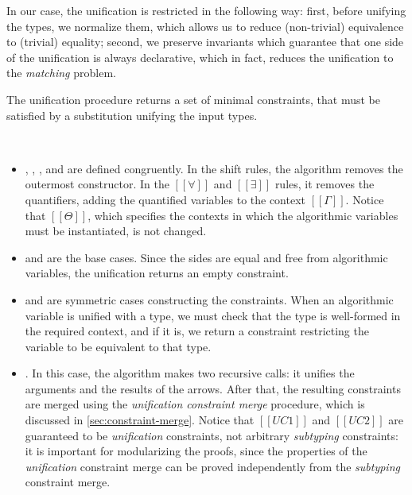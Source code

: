 \documentclass[acmsmall,natbib=false,review,anonymous]{acmart}
\begin{document}
In our case, the unification is restricted in the following way:
first, before unifying the types, we normalize them, which 
allows us to reduce (non-trivial) equivalence to (trivial) equality;
second, we preserve invariants which guarantee that
one side of the unification is always declarative, which in fact, 
reduces the unification to the \emph{matching} problem.

The unification procedure
returns a set of minimal constraints,
that must be satisfied by a substitution
unifying the input types.

\begin{algorithm}[Unification]
  \hfill
  \begin{multicols}{2}
  \ottdefnUNUnif{}
  \columnbreak\\
  \ottdefnUPUnif{}
  \end{multicols}
\end{algorithm}


\begin{itemize}
  \item {}, , 
    , and 
    are defined congruently. In the shift rules, the algorithm
    removes the outermost constructor. In the
    $[[∀]]$ and $[[∃]]$ rules, it removes the quantifiers,
    adding the quantified variables to the context $[[Γ]]$.
    Notice that $[[Θ]]$, which specifies
    the contexts in which the algorithmic variables must be instantiated,
    is not changed.
  \item {} and  
    are the base cases. 
    Since the sides are equal and free from algorithmic variables,
    the unification returns an empty constraint. 
  \item {} and 
    are symmetric cases constructing the constraints. 
    When an algorithmic variable is unified with a type, 
    we must check that the type is well-formed in the required context,
    and if it is, we return a constraint restricting the variable
    to be equivalent to that type.
  \item {}.
    In this case, the algorithm makes two recursive calls:
    it unifies the arguments and the results of the arrows.
    After that, the resulting constraints are merged using the
    \emph{unification constraint merge} procedure, 
    which is discussed in \cref{sec:constraint-merge}.
    Notice that $[[UC1]]$ and $[[UC2]]$ are guaranteed to be
    \emph{unification} constraints, not arbitrary \emph{subtyping} 
    constraints: it is important for modularizing the proofs, 
    since the properties of the \emph{unification} constraint merge
    can be proved independently from the \emph{subtyping} constraint merge.
\end{itemize}
\end{document}
